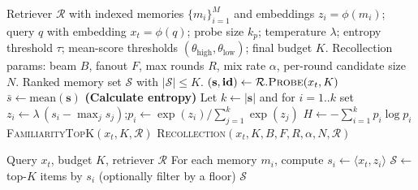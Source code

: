 \begin{algorithm}[h]
\caption{RF-Mem: Entropy-guided Switching Between Familiarity and Recollection (with inlined entropy)}
\label{alg:rfmem-main}
\begin{algorithmic}[1]
\Require Retriever $\mathcal{R}$ with indexed memories $\{m_i\}_{i=1}^M$ and embeddings $z_i=\phi(m_i)$; query $q$ with embedding $x_t=\phi(q)$; probe size $k_p$; temperature $\lambda$; entropy threshold $\tau$; mean-score thresholds $(\theta_{\text{high}}, \theta_{\text{low}})$; final budget $K$. Recollection params: beam $B$, fanout $F$, max rounds $R$, mix rate $\alpha$, per-round candidate size $N$.
\Ensure Ranked memory set $\mathcal{S}$ with $|\mathcal{S}|\le K$.
\State $(\mathbf{s}, \mathbf{id}) \gets \mathcal{R}.\textsc{Probe}(x_t, K)$ 
\State $\bar{s} \gets \mathrm{mean}(\mathbf{s})$
\State \textbf{(Calculate entropy)} Let $k\gets|\mathbf{s}|$ and for $i=1..k$ set
\State \hspace{1em}$z_i \gets \lambda\,(s_i - \max_{j} s_j)$;\quad $p_i \gets \exp(z_i)\big/\sum_{j=1}^{k}\exp(z_j)$
\State $H \gets -\sum_{i=1}^{k} p_i \log p_i$
  \State \Return \textsc{FamiliarityTopK}$(x_t, K, \mathcal{R})$
  \State \Return \textsc{Recollection}$(x_t, K, B, F, R, \alpha, N, \mathcal{R})$
\EndIf
\end{algorithmic}
\end{algorithm}

\begin{algorithm}[h]
\caption{Familiarity Retrieval}
\label{alg:rfmem-fam}
\begin{algorithmic}[1]
\Require Query $x_t$, budget $K$, retriever $\mathcal{R}$
\State For each memory $m_i$, compute $s_i \gets \langle x_t, z_i\rangle$ 
\State $\mathcal{S} \gets$ top-$K$ items by $s_i$ (optionally filter by a floor)
\State \Return $\mathcal{S}$
\end{algorithmic}
\end{algorithm}

